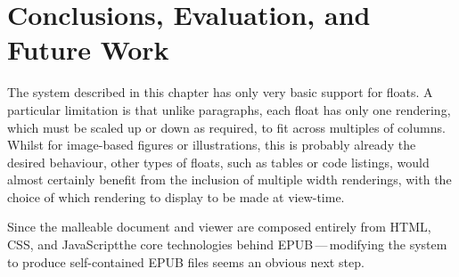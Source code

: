 \chapter{Conclusions, Evaluation, and Future Work}\label{ch:conclusions}


The system described in this chapter has only very basic support for floats. A particular limitation is that unlike paragraphs, each float has only one rendering, which must be scaled up or down as required, to fit across multiples of columns. Whilst for image-based figures or illustrations, this is probably already the desired behaviour, other types of floats, such as tables or code listings, would almost certainly benefit from the inclusion of multiple width renderings, with the choice of which rendering to display to be made at view-time. %


Since the malleable document and viewer are composed entirely from HTML, CSS, and JavaScript\ed the core technologies behind EPUB\,---\,modifying the system to produce self-contained EPUB files seems an obvious next step.

